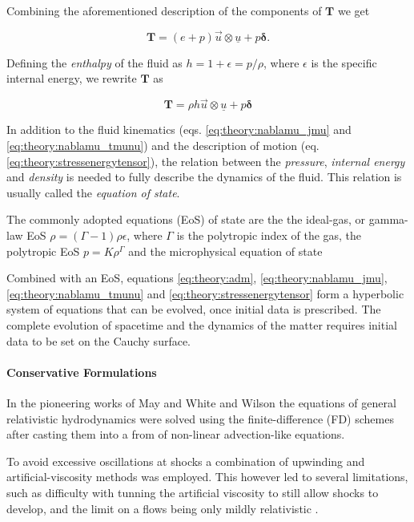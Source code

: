 Combining the aforementioned description of the components of $\boldsymbol{T}$ we get

\begin{equation}
\boldsymbol{T} = (e + p)\vec{u}\otimes \underline{u} + p\boldsymbol{\delta}.
\end{equation}

Defining the \textit{enthalpy} of the fluid as $h = 1 + \epsilon = p/\rho$, where $\epsilon$ is the specific internal energy, we rewrite $\boldsymbol{T}$ as 

\begin{equation}
\boldsymbol{T} = \rho h \vec{u}\otimes\underline{u} + p\boldsymbol{\delta}
\label{eq:theory:stressenergytensor}
\end{equation}

In addition to the fluid kinematics (eqs. \ref{eq:theory:nablamu_jmu} and \ref{eq:theory:nablamu_tmunu}) and the description of motion (eq. \ref{eq:theory:stressenergytensor}), the relation between the \textit{pressure}, \textit{internal energy} and \textit{density} is needed to fully describe the dynamics of the fluid. 
This relation is usually called the \textit{equation of state}.

The commonly adopted equations (EoS) of state are the the ideal-gas, or gamma-law EoS $\rho = (\Gamma-1)\rho\epsilon$, where $\Gamma$ is the polytropic index of the gas, the polytropic EoS $p = K\rho^{\Gamma}$ and the microphysical equation of state 

Combined with an EoS, equations \ref{eq:theory:adm}, \ref{eq:theory:nablamu_jmu}, \ref{eq:theory:nablamu_tmunu} and \ref{eq:theory:stressenergytensor} form a hyperbolic
system of equations that can be evolved, once initial data is prescribed. 
The complete evolution of spacetime and the dynamics of the matter requires initial data to be set on the Cauchy surface.


\paragraph{Conservative Formulations}

In the pioneering works of May and White \cite{May:1966} and Wilson \cite{Wilson:1972} the equations of general relativistic hydrodynamics were solved using the finite-difference (FD) schemes after casting them into a from of non-linear advection-like equations. 

To avoid excessive oscillations at shocks a combination of upwinding and artificial-viscosity methods was employed. 
This however led to several limitations, such as difficulty with tunning the artificial viscosity to still allow shocks to develop, and the limit on a flows being only mildly relativistic \cite{Font:2008fka}. 

